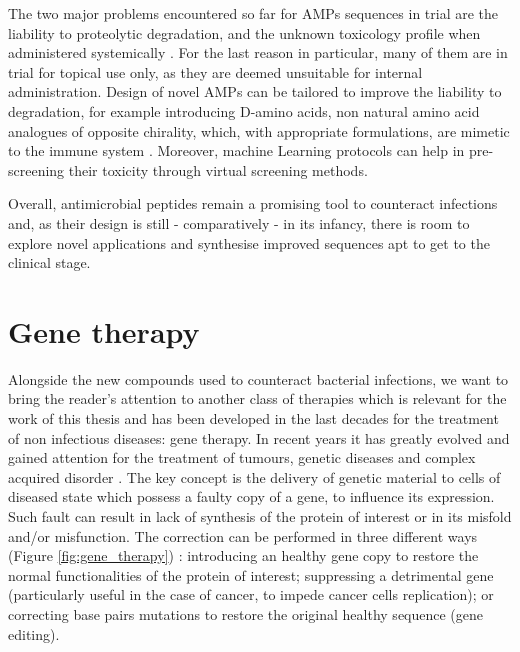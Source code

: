 The two major problems encountered so far for AMPs sequences in trial are the liability to proteolytic degradation, and the unknown toxicology profile when administered systemically \citep{Hancock2006}. For the last reason in particular, many of them are in trial for topical use only, as they are deemed unsuitable for internal administration.
%
Design of novel AMPs can be tailored to improve the liability to degradation, for example introducing D-amino acids, non natural amino acid analogues of opposite chirality, which, with appropriate formulations, are mimetic to the immune system \citep{Wipf2009}. Moreover, machine Learning protocols can help in pre-screening their toxicity through virtual screening methods.

Overall, antimicrobial peptides remain a promising tool to counteract infections and, as their design is still - comparatively - in its infancy, there is room to explore novel applications and synthesise improved sequences apt to get to the clinical stage.


\section{Gene therapy} \label{sec:gene_th}
Alongside the new compounds used to counteract bacterial infections, we want to bring the reader's attention to another class of therapies which is relevant for the work of this thesis and has been developed in the last decades for the treatment of non infectious diseases: gene therapy. In recent years it has greatly evolved and gained attention for the treatment of tumours, genetic diseases and complex acquired disorder \citep{Anguela2019}.
%
The key concept is the delivery of genetic material to cells of diseased state which possess a faulty copy of a gene, to influence its expression. Such fault can result in lack of synthesis of the protein of interest or in its misfold and/or misfunction. The correction can be performed in three different ways (Figure \ref{fig:gene_therapy}) \citep{Anguela2019}:
%
introducing an healthy gene copy to restore the normal functionalities of the protein of interest;
%
suppressing a detrimental gene (particularly useful in the case of cancer, to impede cancer cells replication);
%
or correcting base pairs mutations to restore the original healthy sequence (gene editing).
%

